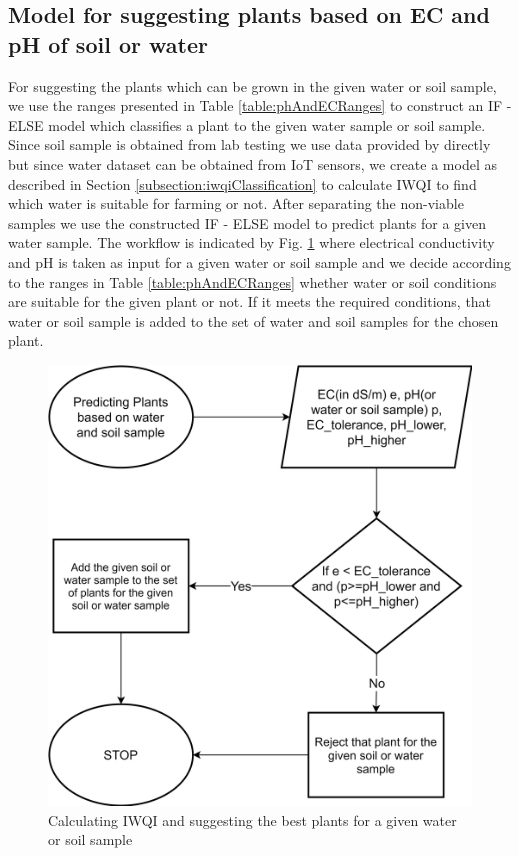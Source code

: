 \subsection{Model for suggesting plants based on EC and pH of soil or water}
\label{subsection:plantSelection}
For suggesting the plants which can be grown in the given water or soil sample, we use the ranges presented in Table \ref{table:phAndECRanges} to construct an IF - ELSE model which classifies a plant to the given water sample or soil sample. Since soil sample is obtained from lab testing we use data provided by \cite{dataset:lucas} directly but since water dataset can be obtained from IoT sensors, we create a model as described in Section \ref{subsection:iwqiClassification} to calculate IWQI to find which water is suitable for farming or not. After separating the non-viable samples we use the constructed IF - ELSE model to predict plants for a given water sample. 
The workflow is indicated by Fig. \ref{fig:phAndECRanges} where electrical conductivity and pH is taken as input for a given water or soil sample and we decide according to the ranges in Table \ref{table:phAndECRanges} whether water or soil conditions are suitable for the given plant or not. If it meets the required conditions, that water or soil sample is added to the set of water and soil samples for the chosen plant.

\begin{figure}[H]
\includegraphics[width=0.7\linewidth]{Model for suggesting plants.png}
\centering
\caption{Calculating IWQI and suggesting the best plants for a given water or soil sample}
\label{fig:phAndECRanges}
\end{figure}


